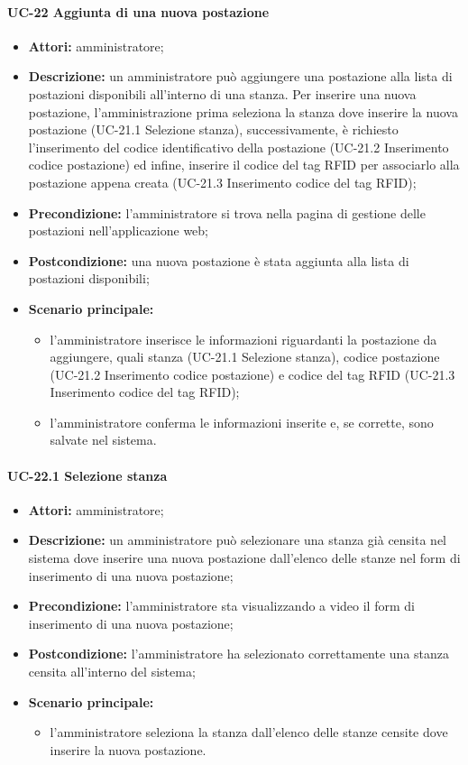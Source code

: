 \paragraph{UC-22 Aggiunta di una nuova postazione}
\begin{itemize}
    \item \textbf{Attori:} amministratore;
    \item \textbf{Descrizione:} un amministratore pu\`{o} aggiungere una postazione alla lista di postazioni disponibili all'interno di una stanza. Per inserire una nuova postazione, l'amministrazione prima seleziona la stanza dove inserire la nuova postazione (UC-21.1 Selezione stanza), successivamente, è richiesto l'inserimento del codice identificativo della postazione (UC-21.2 Inserimento codice postazione) ed infine, inserire il codice del tag RFID per associarlo alla postazione appena creata (UC-21.3 Inserimento codice del tag RFID);
    \item \textbf{Precondizione:} l'amministratore si trova nella pagina di gestione delle postazioni nell'applicazione web;
    \item \textbf{Postcondizione:} una nuova postazione \`{e} stata aggiunta alla lista di postazioni disponibili;
    \item \textbf{Scenario principale:}
    \begin{itemize}
        \item l'amministratore inserisce le informazioni riguardanti la postazione da aggiungere, quali stanza (UC-21.1 Selezione stanza), codice postazione (UC-21.2 Inserimento codice postazione) e codice del tag RFID (UC-21.3 Inserimento codice del tag RFID);
        \item l'amministratore conferma le informazioni inserite e, se corrette, sono salvate nel sistema.
    \end{itemize}
\end{itemize}


\paragraph{UC-22.1 Selezione stanza}
\begin{itemize}
    \item \textbf{Attori:} amministratore;
    \item \textbf{Descrizione:} un amministratore pu\`{o} selezionare una stanza già censita nel sistema dove inserire una nuova postazione dall'elenco delle stanze nel form di inserimento di una nuova postazione;
    \item \textbf{Precondizione:} l'amministratore sta visualizzando a video il form di inserimento di una nuova postazione;
    \item \textbf{Postcondizione:} l'amministratore ha selezionato correttamente una stanza censita all'interno del sistema;
    \item \textbf{Scenario principale:}
    \begin{itemize}
        \item l'amministratore seleziona la stanza dall'elenco delle stanze censite dove inserire la nuova postazione.
    \end{itemize}
\end{itemize}


